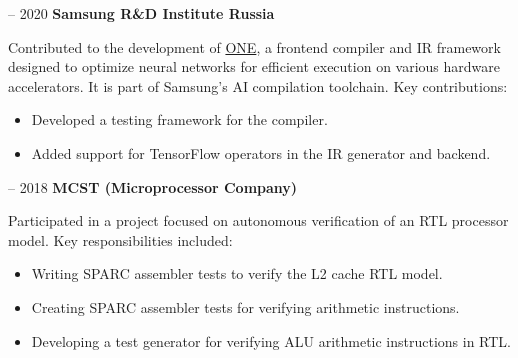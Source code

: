 \documentclass[11pt, a4paper]{cv_template}
\begin{document}
{\hspace{1em} \large \faBuilding {} -- 2020 \quad \textbf{Samsung R\&D Institute Russia}} \par
\begin{addmargin}[3em]{0em}
Contributed to the development of \href{https://github.com/Samsung/ONE}{ONE}, a frontend compiler and IR framework designed to optimize neural networks for efficient execution on various hardware accelerators. It is part of Samsung’s AI compilation toolchain. Key contributions:
\begin{itemize}[noitemsep, topsep=0pt]
\item Developed a testing framework for the compiler.
\item Added support for TensorFlow operators in the IR generator and backend.
\end{itemize}
\end{addmargin}

{\hspace{1em} \large \faBuilding {} -- 2018 \quad \textbf{MCST (Microprocessor Company)}}
\begin{addmargin}[3em]{0em}
Participated in a project focused on autonomous verification of an RTL processor model. Key responsibilities included:
\begin{itemize}[noitemsep, topsep=0pt]
  \item Writing SPARC assembler tests to verify the L2 cache RTL model.
  \item Creating SPARC assembler tests for verifying arithmetic instructions.
  \item Developing a test generator for verifying ALU arithmetic instructions in RTL.
\end{itemize}
\end{addmargin}
\end{document}
